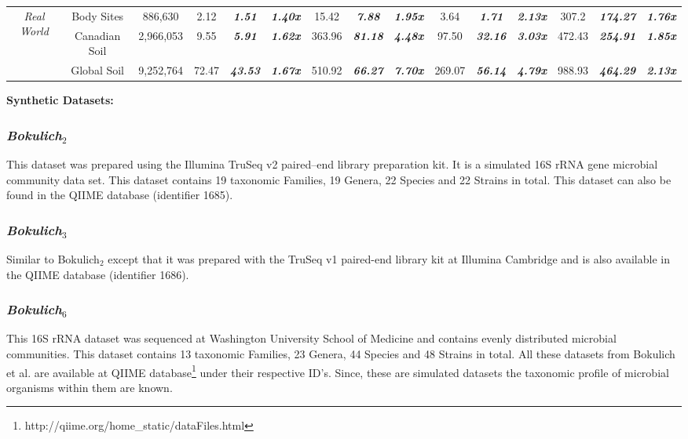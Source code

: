\documentclass[10pt, conference, compsocconf]{IEEEtran}
\begin{document}
\begin{table}
{\begin{tabular}{|c c c|c c c|c c c|c c c|c c c|}
			\multirow{3}{*}{\textit{Real World}} & Body Sites & 886,630 & 2.12 & \textit{\textbf{1.51}} & \textit{\textbf{1.40x}} & 15.42 & \textit{\textbf{7.88}} & \textit{\textbf{1.95x}} & 3.64  & \textit{\textbf{1.71}} & \textit{\textbf{2.13x}} & 307.2 & \textit{\textbf{174.27}} & \textit{\textbf{1.76x}}\\
			& Canadian Soil & 2,966,053 & 9.55 & \textit{\textbf{5.91}} & \textit{\textbf{1.62x}} & 363.96 & \textit{\textbf{81.18}} & \textit{\textbf{4.48x}} & 97.50 & \textit{\textbf{32.16}} & \textit{\textbf{3.03x}}  & 472.43 & \textit{\textbf{254.91}} & \textit{\textbf{1.85x}}\\
			& Global Soil & 9,252,764 & 72.47 &  \textit{\textbf{43.53}} & \textit{\textbf{1.67x}} & 510.92 & \textit{\textbf{66.27}} & \textit{\textbf{7.70x}} & 269.07 &  \textit{\textbf{56.14}} & \textit{\textbf{4.79x}} & 988.93 & \textit{\textbf{464.29}} & \textit{\textbf{2.13x}}\\
			
			\hline 
			
		\end{tabular}
	}
\end{table} 

\textbf{Synthetic Datasets:}

\subsubsection{\textit{Bokulich$_2$}}
This dataset was prepared using the 
Illumina TruSeq v2 paired--end library
preparation kit. It is a simulated 16S rRNA gene 
microbial community data set.
This 
dataset contains 19 taxonomic Families, 19 Genera, 22 Species 
and 22 Strains in total. This dataset can also be 
found in the QIIME database (identifier 1685).

\subsubsection{\textit{Bokulich$_3$}}
Similar to Bokulich$_2$ except that it was 
prepared with the 
TruSeq v1 paired-end library kit at 
Illumina Cambridge and is  also available in the 
QIIME database (identifier 1686).

\subsubsection{\textit{Bokulich$_6$}}
This  16S rRNA dataset 
was sequenced at Washington University School of Medicine and 
contains evenly distributed microbial communities. This 
dataset contains 13 taxonomic 
Families, 23 Genera, 44 Species and 48 Strains in total.
%
All these datasets from Bokulich et al. \cite{MARmockDatasetRef} are 
available at QIIME database\footnote{http://qiime.org/home\_static/dataFiles.html} under their respective ID's. Since, these are simulated 
datasets the taxonomic profile of microbial organisms within them 
are known.
\end{document}
